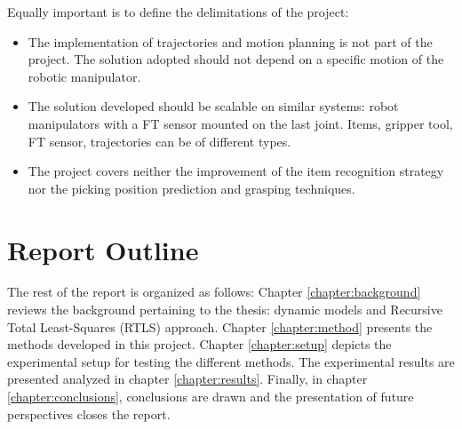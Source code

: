 \documentclass[/home/francois/latex/report/main.tex]{subfiles}
\begin{document}
Equally important is to define the delimitations of the project:

\begin{itemize}
    \item The implementation of trajectories and motion planning is not part of the project. The solution adopted should not depend on a specific motion of the robotic manipulator.
    \item The solution developed should be scalable on similar systems: robot manipulators with a \ac{FT} sensor mounted on the last joint. Items, gripper tool, \ac{FT} sensor, trajectories can be of different types.
    \item The project covers neither the improvement of the item recognition strategy nor the picking position prediction and grasping techniques.
\end{itemize}


\section{Report Outline}

The rest of the report is organized as follows: Chapter \ref{chapter:background} reviews the background pertaining to the thesis: dynamic models and Recursive Total Least-Squares (RTLS) approach. Chapter \ref{chapter:method} presents the methods developed in this project. Chapter \ref{chapter:setup} depicts the experimental setup for testing the different methods. The experimental results are presented analyzed in chapter \ref{chapter:results}. Finally, in chapter \ref{chapter:conclusions}, conclusions are drawn and the presentation of future perspectives closes the report.
\end{document}
